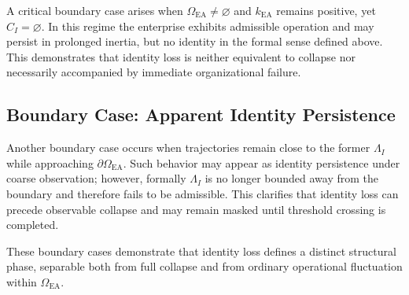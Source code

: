 A critical boundary case arises when $\Omega_{\mathrm{EA}} \neq \varnothing$ and
$k_{\mathrm{EA}}$ remains positive, yet $C_I = \varnothing$. In this regime the
enterprise exhibits admissible operation and may persist in prolonged inertia,
but no identity in the formal sense defined above. This demonstrates that
identity loss is neither equivalent to collapse nor necessarily accompanied by
immediate organizational failure.

\subsection{Boundary Case: Apparent Identity Persistence}

Another boundary case occurs when trajectories remain close to the former
$\Lambda_I$ while approaching $\partial\Omega_{\mathrm{EA}}$. Such behavior may
appear as identity persistence under coarse observation; however, formally
$\Lambda_I$ is no longer bounded away from the boundary and therefore fails to be
admissible. This clarifies that identity loss can precede observable collapse and
may remain masked until threshold crossing is completed.

These boundary cases demonstrate that identity loss defines a distinct structural
phase, separable both from full collapse and from ordinary operational
fluctuation within $\Omega_{\mathrm{EA}}$.

